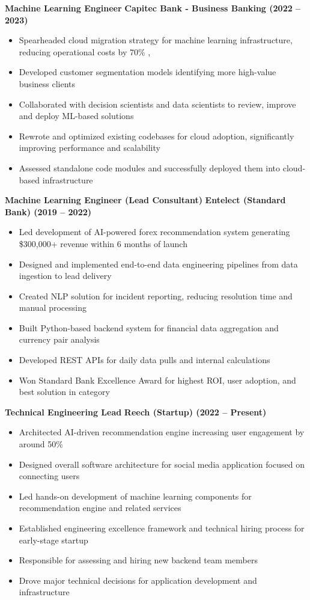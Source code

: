 \documentclass[a4paper,10pt]{article}
\begin{document}
\textbf{Machine Learning Engineer} \hfill \textbf{Capitec Bank - Business Banking (2022 – 2023)}
\begin{itemize}[noitemsep,topsep=0pt]
    \item Spearheaded cloud migration strategy for machine learning infrastructure, reducing operational costs by 70\% ,
    \item Developed customer segmentation models identifying more high-value business clients
    \item Collaborated with decision scientists and data scientists to review, improve and deploy ML-based solutions
    \item Rewrote and optimized existing codebases for cloud adoption, significantly improving performance and scalability
    \item Assessed standalone code modules and successfully deployed them into cloud-based infrastructure
\end{itemize}

\textbf{Machine Learning Engineer (Lead Consultant)} \hfill \textbf{Entelect (Standard Bank) (2019 – 2022)}
\begin{itemize}[noitemsep,topsep=0pt]
    \item Led development of AI-powered forex recommendation system generating \$300,000+ revenue within 6 months of launch
    \item Designed and implemented end-to-end data engineering pipelines from data ingestion to lead delivery
    \item Created NLP solution for incident reporting, reducing resolution time and manual processing
    \item Built Python-based backend system for financial data aggregation and currency pair analysis
    \item Developed REST APIs for daily data pulls and internal calculations
    \item Won Standard Bank Excellence Award for highest ROI, user adoption, and best solution in category
\end{itemize}

\textbf{Technical Engineering Lead} \hfill \textbf{Reech (Startup) (2022 – Present)}
\begin{itemize}[noitemsep,topsep=0pt]
    \item Architected AI-driven recommendation engine increasing user engagement by around 50\%
    \item Designed overall software architecture for social media application focused on connecting users
    \item Led hands-on development of machine learning components for recommendation engine and related services
    \item Established engineering excellence framework and technical hiring process for early-stage startup
    \item Responsible for assessing and hiring new backend team members
    \item Drove major technical decisions for application development and infrastructure
\end{itemize}
\end{document}
